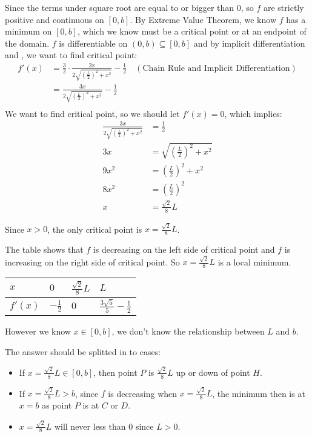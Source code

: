 \documentclass[12pt]{exam}
\newcommand*\circled[1]{\tikz[baseline=(char.base)]{
    \node[shape=circle, draw, inner sep=1pt, 
        minimum height=12pt] (char) {#1};}}
\begin{document}
\begin{enumerate}
Since the terms under square root are equal to or bigger than $0$, so $f$ are strictly positive and continuous on $[0,b]$. By Extreme Value Theorem, we know $f$ has a minimum on $[0,b]$, which we know must be a critical point or at an endpoint of the domain. $f$ is differentiable on $(0,b)\subseteq[0,b]$ and by implicit differentiation and \circled{3}, we want to find critical point:
\begin{align*}
    f'(x)
    &=\frac{3}{2}\cdot\frac{2x}{2\sqrt{(\frac{L}{2})^2+x^2}}-\frac{1}{2} \quad(\mbox{Chain Rule and Implicit Differentiation})\\
    &=\frac{3x}{2\sqrt{(\frac{L}{2})^2+x^2}}-\frac{1}{2}\\
\end{align*}
We want to find critical point, so we should let $f'(x) = 0$, which implies:
\begin{align*}
    \frac{3x}{2\sqrt{(\frac{L}{2})^2+x^2}}&=\frac{1}{2}\\
    3x&=\sqrt{(\frac{L}{2})^2+x^2}\\
    9x^2&=(\frac{L}{2})^2+x^2\\
    8x^2&=(\frac{L}{2})^2\\
    x&=\frac{\sqrt{2}}{8}L
\end{align*}

Since $x > 0$, the only critical point is $x=\frac{\sqrt{2}}{8}L$.

The table shows that $f$ is decreasing on the left side of critical point and $f$ is increasing on the right side of critical point. So $x=\frac{\sqrt{2}}{8}L$ is a local minimum.

\begin{tabular}{l|l|l|l}
\hline
$x$     & $0$            & $\frac{\sqrt{2}}{8}L$ & $L$                               \\
\hline
$f'(x)$ & $-\frac{1}{2}$ & $0$                   & $\frac{3\sqrt{5}}{5}-\frac{1}{2}$
\end{tabular}

However we know $x\in[0,b]$, we don't know the relationship between $L$ and $b$.

The answer should be splitted in to cases:
\begin{itemize}
    \item If $x=\frac{\sqrt{2}}{8}L\in [0,b]$, then point $P$ is $\frac{\sqrt{2}}{8}L$ up or down of point $H$.
    \item If $x=\frac{\sqrt{2}}{8}L>b$, since $f$ is decreasing when $x=\frac{\sqrt{2}}{8}L$, the minimum then is at $x=b$ as point $P$ is at $C$ or $D$.
    \item $x=\frac{\sqrt{2}}{8}L$ will never less than $0$ since $L>0$.
\end{itemize}


\end{enumerate}
\end{document}
